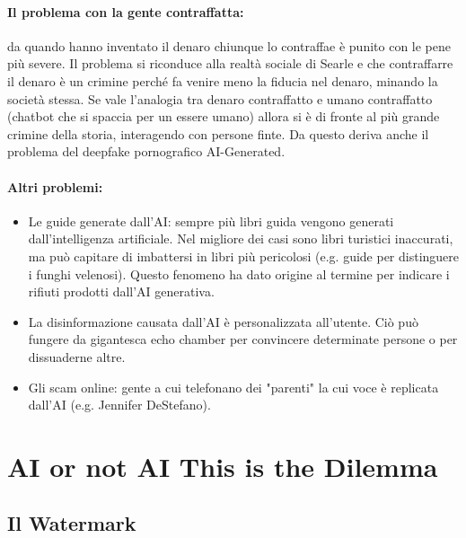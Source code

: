 \paragraph{Il problema con la gente contraffatta:} da quando hanno inventato il denaro chiunque lo contraffae è punito con le pene più severe. Il problema si riconduce alla realtà sociale di Searle e che contraffarre il denaro è un crimine perché fa venire meno la fiducia nel denaro, minando la società stessa. Se vale l'analogia tra denaro contraffatto e umano contraffatto (chatbot che si spaccia per un essere umano) allora si è di fronte al più grande crimine della storia, interagendo con persone finte. Da questo deriva anche il problema del deepfake pornografico AI-Generated. 

\paragraph{Altri problemi:}

\begin{itemize}
  \item Le guide generate dall'AI: sempre più libri guida vengono generati dall'intelligenza artificiale. Nel migliore dei casi sono libri turistici inaccurati, ma può capitare di imbattersi in libri più pericolosi (e.g. guide per distinguere i funghi velenosi). Questo fenomeno ha dato origine al termine  per indicare i rifiuti prodotti dall'AI generativa. 
  \item La disinformazione causata dall'AI è personalizzata all'utente. Ciò può fungere da gigantesca echo chamber per convincere determinate persone o per dissuaderne altre. 
  \item Gli scam online: gente a cui telefonano dei "parenti" la cui voce è replicata dall'AI (e.g. Jennifer DeStefano).
\end{itemize}

\section{AI or not AI This is the Dilemma}

\subsection{Il Watermark}


